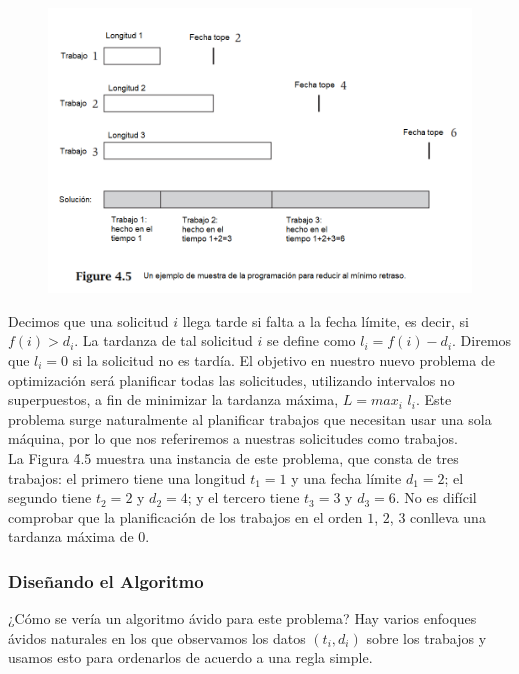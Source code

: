 \documentclass[a4paper, 12pt]{book}
\theoremstyle{dotless}
\begin{document}
\begin{figure}[h]
\centering
\includegraphics[scale=0.5]{Imagenes-Seccion4/Fig_4_5.PNG}
\end{figure}


Decimos que una solicitud $i$ llega tarde si falta a la fecha límite, es decir, si $f(i)>d_i$. La tardanza de tal solicitud $i$ se define como $l_i = f (i) - d_i$. Diremos que $l_i = 0$ si la solicitud no es tardía. El objetivo en nuestro nuevo problema de optimización será planificar todas las solicitudes, utilizando intervalos no superpuestos, a fin de minimizar la tardanza máxima, $L = max_i$ $l_i$. Este problema surge naturalmente al planificar trabajos que necesitan usar una sola máquina, por lo que nos referiremos a nuestras solicitudes como trabajos.\\

La Figura 4.5 muestra una instancia de este problema, que consta de tres trabajos: el primero tiene una longitud $t_1 = 1$ y una fecha límite $d_1 = 2$; el segundo tiene $t_2 = 2$ y $d_2 = 4$; y el tercero tiene $t_3 = 3$ y $d_3 = 6$. No es difícil comprobar que la planificación de los trabajos en el orden $1$, $2$, $3$ conlleva una tardanza máxima de $0$.\\

\subsubsection*{Diseñando el Algoritmo}
¿Cómo se vería un algoritmo ávido para este problema? Hay varios enfoques ávidos naturales en los que observamos los datos $(t_i, d_i)$ sobre los trabajos y usamos esto para ordenarlos de acuerdo a una regla simple.\\
\end{document}
